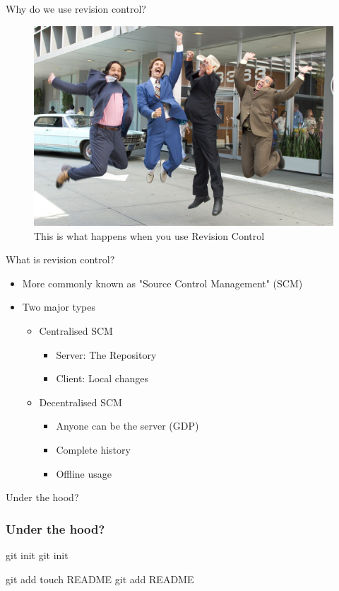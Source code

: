 \documentclass{beamer}
\begin{document}
\begin{frame}{Why do we use revision control?}
\begin{figure}[ht]
\centering
\includegraphics[width=0.8\linewidth]{img/winning.jpg}
\caption{This is what happens when you use Revision Control}
\label{fig:figure1}
\end{figure}
\end{frame}

\begin{frame}{What is revision control?}
\begin{itemize}
    \item More commonly known as "Source Control Management" (SCM)
    \item Two major types
    \begin{itemize}
        \item Centralised SCM
        \begin{itemize}
            \item Server: The Repository
            \item Client: Local changes
        \end{itemize}
        \item Decentralised SCM
        \begin{itemize}
            \item Anyone can be the server (GDP)
            \item Complete history
            \item Offline usage
        \end{itemize}
    \end{itemize}  
\end{itemize}  
\end{frame}

\begin{frame}{Under the hood?}
\frametitle{Under the hood?}
\end{frame}

\begin{frame}{git init}
git init
\end{frame}

\begin{frame}{git add}
touch README
git add README
\end{frame}
\end{document}
